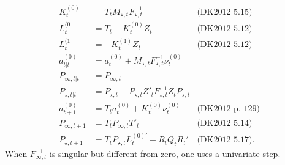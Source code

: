 \documentclass{article}
\begin{document}
\begin{align*}
  K^{(0)}_t &= T_tM_{\star,t}F^{-1}_{\star,t}& \mbox{(DK2012 5.15)}\\
  L^{(0}_t &= T_t - K^{(0)}_tZ_t & \mbox{(DK2012 5.12)}\\
  L^{(1}_t &= - K^{(1)}_tZ_t & \mbox{(DK2012 5.12)}\\
  a^{(0)}_{t|t} &= a^{(0)}_t + M_{\star,t}F^{-1}_{\star,t}\nu^{(0)}_t\\
  P_{\infty,t|t} &= P_{\infty,t} \\
  P_{\star,t|t} &= P_{\star,t} - P_{\star,t}Z'_t
                  F^{-1}_{\star,t}Z_tP_{\star,t} \\
  a^{(0)}_{t+1} &= T_ta^{(0)}_t + K^{(0)}_t\nu^{(0)}_t & \mbox{(DK2012 
                                                         p. 129)}\\
  P_{\infty,t+ 1} &= T_tP_{\infty,t}T'_t & \mbox{(DK2012 5.14)}\\
  P_{\star, t+1} &= T_tP_{\star,t}L^{(0)'}_t + R_tQ_tR_t' & \mbox{(DK2012 5.17).}
\end{align*}
When $F^{-1}_{\infty,t}$ is singular but different from zero, one uses
a univariate step.
\end{document}
